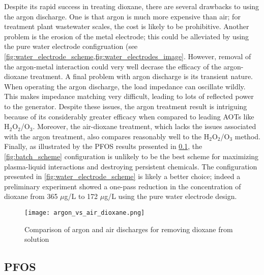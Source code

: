 Despite its rapid success in treating dioxane, there are several drawbacks to using the argon discharge. One is that argon is much more expensive than air; for treatment plant wastewater scales, the cost is likely to be prohibitive. Another problem is the erosion of the metal electrode; this could be alleviated by using the pure water electrode configruation (see \cref{fig:water_electrode_scheme,fig:water_electrodes_image}. However, removal of the argon-metal interaction could very well decrase the efficacy of the argon-dioxane treatment. A final problem with argon discharge is its transient nature. When operating the argon discharge, the load impedance can oscillate wildly. This makes impedance matching very difficult, leading to lots of reflected power to the generator. Despite these issues, the argon treatment result is intriguing because of its considerably greater efficacy when compared to leading AOTs like H$_2$O$_2$/O$_3$. Moreover, the air-dioxane treatment, which lacks the issues associated with the argon treatment, also compares reasonably well to the H$_2$O$_2$/O$_3$ method. Finally, as illustrated by the PFOS results presented in \cref{sec:PFOS}, the \cref{fig:batch_scheme} configuration is unlikely to be the best scheme for maximizing plasma-liquid interactions and destroying persistent chemicals. The configuration presented in \cref{fig:water_electrode_scheme} is likely a better choice; indeed a preliminary experiment showed a one-pass reduction in the concentration of dioxane from 365 $\mu$g/L to 172 $\mu$g/L using the pure water electrode design.

\begin{figure}[htbp]
  \centering
  \texttt{[image: argon\_vs\_air\_dioxane.png]}
  \caption{Comparison of argon and air discharges for removing dioxane from solution}
  \label{fig:diox_compare_argon_air}
\end{figure}

\subsection{PFOS}
\label{sec:PFOS}

